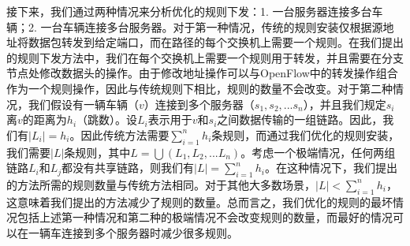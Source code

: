 \documentclass{ctexart}
\begin{document}
%

接下来，我们通过两种情况来分析优化的规则下发：1. 一台服务器连接多台车辆；2. 一台车辆连接多台服务器。对于第一种情况，传统的规则安装仅根据源地址将数据包转发到给定端口，而在路径的每个交换机上需要一个规则。在我们提出的规则下发方法中，我们在每个交换机上需要一个规则用于转发，并且需要在分支节点处修改数据头的操作。由于修改地址操作可以与OpenFlow中的转发操作组合作为一个规则操作，因此与传统规则下相比，规则的数量不会改变。对于第二种情况，我们假设有一辆车辆（$v$）连接到多个服务器（$s_1,s_2, ... s_n$），并且我们规定$s_i$离$v$的距离为$h_i$（跳数）。设$ L_i $表示用于$ v $和$ s_i $之间数据传输的一组链路。因此，我们有$|L_i| = h_i$。因此传统方法需要$\sum_{i=1}^{n} h_i$条规则，而通过我们优化的规则安装，我们需要$|L|$条规则，其中$L = \bigcup{(L_{1}, L_{2}, ... L_{n})}$。考虑一个极端情况，任何两组链路$L_i$和$L_j$都没有共享链路，则我们有$|L| = \sum_{i=1}^{n} h_i$。在这种情况下，我们提出的方法所需的规则数量与传统方法相同。对于其他大多数场景，$|L| < \sum_{i=1}^{n} h_i$，这意味着我们提出的方法减少了规则的数量。总而言之，我们优化的规则的最坏情况包括上述第一种情况和第二种的极端情况不会改变规则的数量，而最好的情况可以在一辆车连接到多个服务器时减少很多规则。
\end{document}
